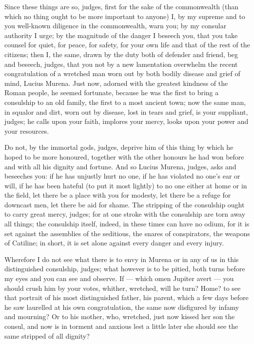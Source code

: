  Since these things are so, judges, first for the sake of the commonwealth (than which no thing ought to be more important to anyone) I, by my supreme and to you well-known diligence in the commonwealth, warn you; by my consular authority I urge; by the magnitude of the danger I beseech you, that you take counsel for quiet, for peace, for safety, for your own life and that of the rest of the citizens; then I, the same, drawn by the duty both of defender and friend, beg and beseech, judges, that you not by a new lamentation overwhelm the recent congratulation of a wretched man worn out by both bodily disease and grief of mind, Lucius Murena. Just now, adorned with the greatest kindness of the Roman people, he seemed fortunate, because he was the first to bring a consulship to an old family, the first to a most ancient town; now the same man, in squalor and dirt, worn out by disease, lost in tears and grief, is your suppliant, judges; he calls upon your faith, implores your mercy, looks upon your power and your resources.

 Do not, by the immortal gods, judges, deprive him of this thing by which he hoped to be more honoured, together with the other honours he had won before and with all his dignity and fortune. And so Lucius Murena, judges, asks and beseeches you: if he has unjustly hurt no one, if he has violated no one's ear or will, if he has been hateful (to put it most lightly) to no one either at home or in the field, let there be a place with you for modesty, let there be a refuge for downcast men, let there be aid for shame. The stripping of the consulship ought to carry great mercy, judges; for at one stroke with the consulship are torn away all things; the consulship itself, indeed, in these times can have no odium, for it is set against the assemblies of the seditious, the snares of conspirators, the weapons of Catiline; in short, it is set alone against every danger and every injury.

 Wherefore I do not see what there is to envy in Murena or in any of us in this distinguished consulship, judges; what however is to be pitied, both turns before my eyes and you can see and observe. If --- which omen Jupiter avert --- you should crush him by your votes, whither, wretched, will he turn? Home? to see that portrait of his most distinguished father, his parent, which a few days before he saw laurelled at his own congratulation, the same now disfigured by infamy and mourning? Or to his mother, who, wretched, just now kissed her son the consul, and now is in torment and anxious lest a little later she should see the same stripped of all dignity?

